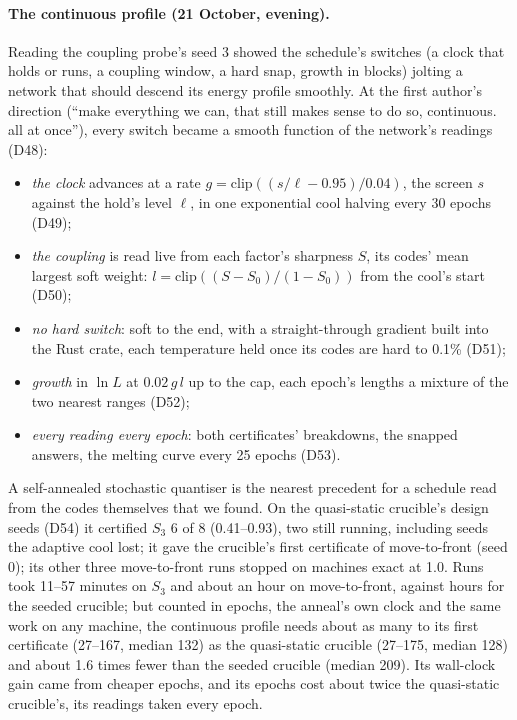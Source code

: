 \documentclass[11pt]{article}
\begin{document}
\paragraph{The continuous profile (21 October, evening).} Reading the coupling probe's seed 3 showed
the schedule's switches (a clock that holds or runs, a coupling window, a hard snap, growth in
blocks) jolting a network that should descend its energy profile smoothly. At the first author's
direction (``make everything we can, that still makes sense to do so, continuous. all at once''),
every switch became a smooth function of the network's readings (D48):
\begin{itemize}
  \item \emph{the clock} advances at a rate $g = \mathrm{clip}((s/\ell - 0.95)/0.04)$, the screen
  $s$ against the hold's level $\ell$, in one exponential cool halving every 30 epochs (D49);
  \item \emph{the coupling} is read live from each factor's sharpness $S$, its codes' mean largest
  soft weight: $l = \mathrm{clip}((S - S_0)/(1 - S_0))$ from the cool's start (D50);
  \item \emph{no hard switch}: soft to the end, with a straight-through gradient
  \citep{bengio-2013-straight-through-estimator} built into the Rust crate, each temperature held once
  its codes are hard to 0.1\% (D51);
  \item \emph{growth} in $\ln L$ at $0.02\,g\,l$ up to the cap, each epoch's lengths a mixture of
  the two nearest ranges (D52);
  \item \emph{every reading every epoch}: both certificates' breakdowns, the snapped answers, the
  melting curve every 25 epochs (D53).
\end{itemize}
A self-annealed stochastic quantiser \citep{takida-2022-sq-vae-self-annealed-stochastic-quantization}
is the nearest precedent for a schedule read from the codes themselves that we found. On the
quasi-static crucible's design seeds (D54) it certified $S_3$ 6 of 8 (0.41--0.93), two still
running, including seeds the adaptive cool lost; it gave the crucible's first certificate of
move-to-front (seed 0); its other three move-to-front runs stopped on machines exact at 1.0. Runs
took 11--57 minutes on $S_3$ and about an hour on move-to-front, against hours for the seeded
crucible; but counted in epochs, the anneal's own clock and the same work on any machine, the
continuous profile needs about as many to its first certificate (27--167, median 132) as the
quasi-static crucible (27--175, median 128) and about 1.6 times fewer than the seeded crucible (median
209). Its wall-clock gain came from cheaper epochs, and its epochs cost about twice the quasi-static
crucible's, its readings taken every epoch.
\end{document}
